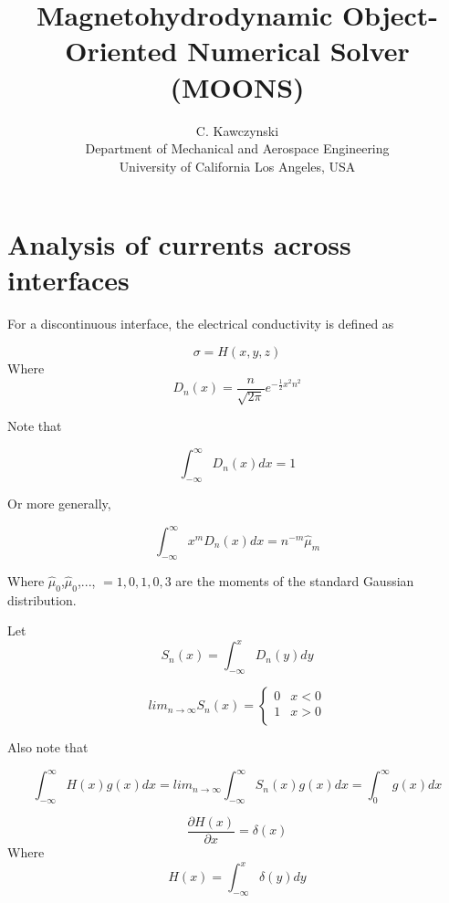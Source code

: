 \documentclass[11pt]{article}
\begin{document}
\doublespacing
\title{Magnetohydrodynamic Object-Oriented Numerical Solver (MOONS)}
\author{C. Kawczynski \\
Department of Mechanical and Aerospace Engineering \\
University of California Los Angeles, USA\\
}
\maketitle

\section{Analysis of currents across interfaces}

For a discontinuous interface, the electrical conductivity is defined as

\begin{equation}
	\sigma = H(x,y,z)
\end{equation}
Where
\begin{equation}
	D_n(x) = \frac{n}{\sqrt{2\pi}} e^{- \frac{1}{2}x^2n^2}
\end{equation}

Note that

\begin{equation}
	\int_{-\infty}^{\infty} D_n(x) dx = 1
\end{equation}

Or more generally,

\begin{equation}
	\int_{-\infty}^{\infty} x^m D_n(x) dx = n^{-m} \hat{\mu}_m
\end{equation}

Where $\hat{\mu}_0$,$\hat{\mu}_0$,..., $=1,0,1,0,3$ are the moments of the standard Gaussian distribution.

Let
\begin{equation}
	S_n(x) = \int_{-\infty}^{x} D_n(y) dy
\end{equation}

\begin{equation}
	lim_{n\rightarrow \infty} S_n(x)
	=
	\begin{cases}
	0 & x<0 \\
	1 & x>0 \\
	\end{cases}
\end{equation}

Also note that

\begin{equation}
	\int_{-\infty}^{\infty} H(x) g(x) dx
	=
	lim_{n\rightarrow \infty}
	\int_{-\infty}^{\infty} S_n(x) g(x) dx
	=
	\int_0^{\infty} g(x) dx
\end{equation}

\begin{equation}
	\frac{\partial H(x)}{\partial x} = \delta (x)
\end{equation}
Where
\begin{equation}
	H(x) = \int_{-\infty}^{x} \delta (y) dy
\end{equation}
\end{document}
